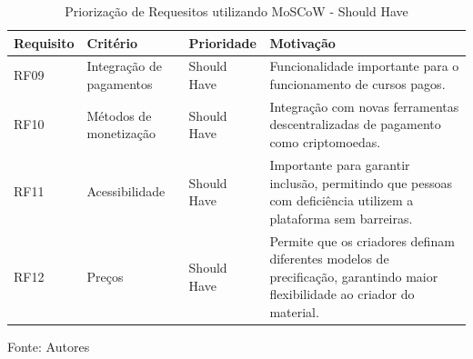 \begin{apendicesenv}
\begin{table}[h]
    \centering
    \caption{Priorização de Requesitos utilizando MoSCoW - Should Have}
    \label{tab:priorizacao_moscow2}
    \begin{adjustbox}{width=\textwidth}
        \begin{tabular}{|p{2.5cm}|p{5cm}|p{5cm}|p{4cm}|}
            \hline
            \textbf{Requisito} & \textbf{Critério} & \textbf{Prioridade} & \textbf{Motivação} \\
            \hline
            RF09 & Integração de pagamentos & Should Have & Funcionalidade importante para o funcionamento de cursos pagos. \\
            \hline
            RF10 & Métodos de monetização & Should Have & Integração com novas ferramentas descentralizadas de pagamento como criptomoedas. \\
            \hline
            RF11 & Acessibilidade & Should Have & Importante para garantir inclusão, permitindo que pessoas com deficiência utilizem a plataforma sem barreiras. \\
            \hline
            RF12 & Preços & Should Have & Permite que os criadores definam diferentes modelos de precificação, garantindo maior flexibilidade ao criador do material. \\
            \hline
        \end{tabular}
    \end{adjustbox}
    \vspace{5mm}
    {\footnotesize Fonte: Autores} 
\end{table}



\end{apendicesenv}
